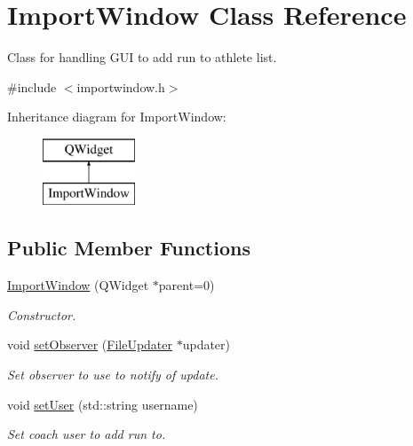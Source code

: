 \hypertarget{classImportWindow}{}\section{Import\+Window Class Reference}
\label{classImportWindow}


Class for handling G\+UI to add run to athlete list.  




{\ttfamily \#include $<$importwindow.\+h$>$}

Inheritance diagram for Import\+Window\+:\begin{figure}[H]
\begin{center}
\leavevmode
\includegraphics[height=2.000000cm]{classImportWindow}
\end{center}
\end{figure}
\subsection*{Public Member Functions}
\begin{DoxyCompactItemize}
\item 
\mbox{\hyperlink{classImportWindow_afe9636b4ecf8c7c7b01439cbd77242be}{Import\+Window}} (Q\+Widget $\ast$parent=0)
\begin{DoxyCompactList}\small\item\em Constructor. \end{DoxyCompactList}\item 
void \mbox{\hyperlink{classImportWindow_a33b83ce4d2baa190574995f4ab88c31b}{set\+Observer}} (\mbox{\hyperlink{classFileUpdater}{File\+Updater}} $\ast$updater)
\begin{DoxyCompactList}\small\item\em Set observer to use to notify of update. \end{DoxyCompactList}\item 
void \mbox{\hyperlink{classImportWindow_afce7ddde4e07a6bdf9cf83fbc37ab5f3}{set\+User}} (std\+::string username)
\begin{DoxyCompactList}\small\item\em Set coach user to add run to. \end{DoxyCompactList}\end{DoxyCompactItemize}


